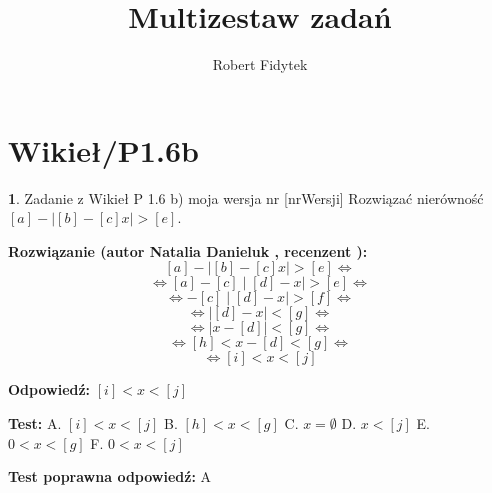 \documentclass[12pt, a4paper]{article}
\title{Multizestaw zadań}
\author{Robert Fidytek}
\date{}
\theoremstyle{definition} %
\newtheorem{zad}{}
\newcommand{\kategoria}[1]{\section{#1}} %
\newcommand{\zadStart}[1]{\begin{zad}#1\newline} %
\newcommand{\zadStop}{\end{zad}}   %
\newcommand{\rozwStart}[2]{\noindent \textbf{Rozwiązanie (autor #1 , recenzent #2): }\newline} %
\newcommand{\rozwStop}{\newline}                                            %
\newcommand{\odpStart}{\noindent \textbf{Odpowiedź:}\newline}    %
\newcommand{\odpStop}{\newline}                                             %
\newcommand{\testStart}{\noindent \textbf{Test:}\newline} %
\newcommand{\testStop}{\newline} %
\newcommand{\kluczStart}{\noindent \textbf{Test poprawna odpowiedź:}\newline} %
\newcommand{\kluczStop}{\newline} %
\begin{document}
\maketitle

\kategoria{Wikieł/P1.6b}

\zadStart{Zadanie z Wikieł P 1.6 b) moja wersja nr [nrWersji]}
Rozwiązać nierówność $[a] - \mid [b] - [c]x \mid > [e]$.
\zadStop

\rozwStart{Natalia Danieluk}{}
$$[a] - \mid [b] - [c]x \mid > [e] \Leftrightarrow$$ 
$$\Leftrightarrow [a] - [c] \mid [d] - x \mid > [e] \Leftrightarrow$$ 
$$\Leftrightarrow - [c] \mid [d] - x \mid > [f] \Leftrightarrow$$ 
$$\Leftrightarrow \mid [d] - x \mid < [g] \Leftrightarrow$$ 
$$\Leftrightarrow \mid x - [d] \mid < [g] \Leftrightarrow$$ 
$$\Leftrightarrow [h] < x - [d] < [g] \Leftrightarrow$$ 
$$\Leftrightarrow [i] < x < [j]$$ 
\rozwStop

\odpStart
$[i] < x < [j]$
\odpStop

\testStart
A. $[i] < x < [j]$
B. $[h] < x < [g]$
C. $x = \emptyset$
D. $x < [j]$
E. $0 < x < [g]$
F. $0 < x < [j]$
\testStop

\kluczStart
A
\kluczStop
\end{document}
